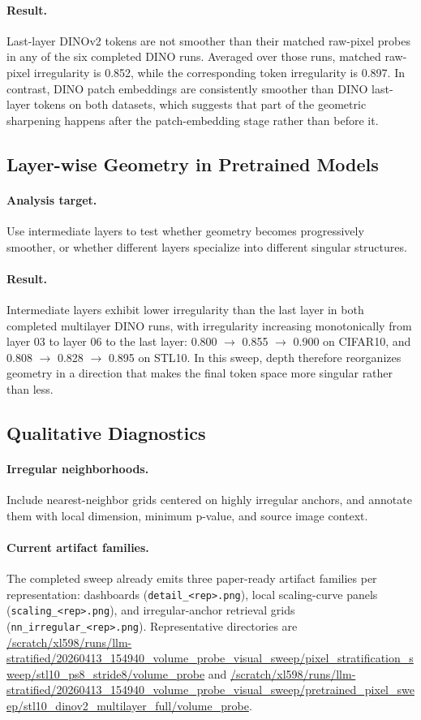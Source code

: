 \documentclass{article}
\newcommand{\dataset}[1]{\textsc{#1}}
\theoremstyle{definition}
\theoremstyle{plain}
\theoremstyle{remark}
\begin{document}
\paragraph{Result.}
Last-layer DINOv2 tokens are not smoother than their matched raw-pixel probes in any of the six completed DINO runs. Averaged over those runs, matched raw-pixel irregularity is 0.852, while the corresponding token irregularity is 0.897. In contrast, DINO patch embeddings are consistently smoother than DINO last-layer tokens on both datasets, which suggests that part of the geometric sharpening happens after the patch-embedding stage rather than before it.

\subsection{Layer-wise Geometry in Pretrained Models}
\paragraph{Analysis target.}
Use intermediate layers to test whether geometry becomes progressively smoother, or whether different layers specialize into different singular structures.

\paragraph{Result.}
Intermediate layers exhibit lower irregularity than the last layer in both completed multilayer DINO runs, with irregularity increasing monotonically from layer 03 to layer 06 to the last layer: 0.800 $\rightarrow$ 0.855 $\rightarrow$ 0.900 on \dataset{CIFAR10}, and 0.808 $\rightarrow$ 0.828 $\rightarrow$ 0.895 on \dataset{STL10}. In this sweep, depth therefore reorganizes geometry in a direction that makes the final token space more singular rather than less.

\subsection{Qualitative Diagnostics}
\paragraph{Irregular neighborhoods.}
Include nearest-neighbor grids centered on highly irregular anchors, and annotate them with local dimension, minimum p-value, and source image context.

\paragraph{Current artifact families.}
The completed sweep already emits three paper-ready artifact families per representation: dashboards (\texttt{detail\_<rep>.png}), local scaling-curve panels (\texttt{scaling\_<rep>.png}), and irregular-anchor retrieval grids (\texttt{nn\_irregular\_<rep>.png}). Representative directories are \url{/scratch/xl598/runs/llm-stratified/20260413_154940_volume_probe_visual_sweep/pixel_stratification_sweep/stl10_ps8_stride8/volume_probe} and \url{/scratch/xl598/runs/llm-stratified/20260413_154940_volume_probe_visual_sweep/pretrained_pixel_sweep/stl10_dinov2_multilayer_full/volume_probe}.
\end{document}
